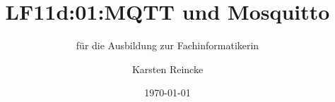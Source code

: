 \documentclass[]{beamer}
\title{LF11d:01:MQTT und Mosquitto}
\subtitle{für die Ausbildung zur Fachinformatikerin}
\institute{GS-LDK}
\author{Karsten Reincke}
\date{\today}
\def\cfgGl{../../../cfg.gl/}
\begin{document}

\begin{frame}
  \titlepage
\end{frame}






\logo{}
\newpage



%
\end{document}
